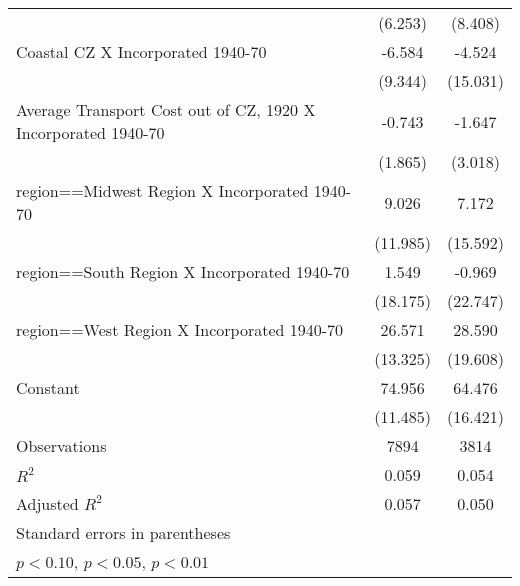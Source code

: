 \begin{table}[htbp]
\begin{tabular}{l*{2}{c}}
                    &     (6.253)         &     (8.408)         \\
[1em]
Coastal CZ X Incorporated 1940-70&      -6.584         &      -4.524         \\
                    &     (9.344)         &    (15.031)         \\
[1em]
Average Transport Cost out of CZ, 1920 X Incorporated 1940-70&      -0.743         &      -1.647         \\
                    &     (1.865)         &     (3.018)         \\
[1em]
region==Midwest Region X Incorporated 1940-70&       9.026         &       7.172         \\
                    &    (11.985)         &    (15.592)         \\
[1em]
region==South Region X Incorporated 1940-70&       1.549         &      -0.969         \\
                    &    (18.175)         &    (22.747)         \\
[1em]
region==West Region X Incorporated 1940-70&      26.571\sym{**} &      28.590         \\
                    &    (13.325)         &    (19.608)         \\
[1em]
Constant            &      74.956\sym{***}&      64.476\sym{***}\\
                    &    (11.485)         &    (16.421)         \\
\hline
Observations        &        7894         &        3814         \\
\(R^{2}\)           &       0.059         &       0.054         \\
Adjusted \(R^{2}\)  &       0.057         &       0.050         \\
\hline\hline
\multicolumn{3}{l}{\footnotesize Standard errors in parentheses}\\
\multicolumn{3}{l}{\footnotesize \sym{*} \(p<0.10\), \sym{**} \(p<0.05\), \sym{***} \(p<0.01\)}\\
\end{tabular}
\end{table}
